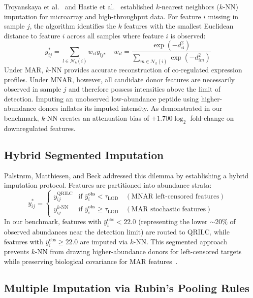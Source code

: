 \documentclass[11pt,oneside]{book}
\begin{document}
Troyanskaya et al.~\cite{troyanskaya2001missing} and Hastie et al.~\cite{hastie2001impute} established $k$-nearest neighbors ($k$-NN) imputation for microarray and high-throughput data. For feature $i$ missing in sample $j$, the algorithm identifies the $k$ features with the smallest Euclidean distance to feature $i$ across all samples where feature $i$ is observed:
\begin{equation}
y_{ij}^* = \sum_{l \in \mathcal{N}_k(i)} w_{il} y_{lj}, \quad w_{il} = \frac{\exp(-d_{il}^2)}{\sum_{m \in \mathcal{N}_k(i)} \exp(-d_{im}^2)}
\end{equation}
Under MAR, $k$-NN provides accurate reconstruction of co-regulated expression profiles. Under MNAR, however, all candidate donor features are necessarily observed in sample $j$ and therefore possess intensities above the limit of detection. Imputing an unobserved low-abundance peptide using higher-abundance donors inflates its imputed intensity. As demonstrated in our benchmark, $k$-NN creates an attenuation bias of $+1.700 \log_2$ fold-change on downregulated features.

\subsection{Hybrid Segmented Imputation}

Palstr\o m, Matthiesen, and Beck \cite{palstrom2020imputation} addressed this dilemma by establishing a hybrid imputation protocol. Features are partitioned into abundance strata:
\begin{equation}
y_{ij}^* = \begin{cases}
y_{ij}^{\text{QRILC}} & \text{if } \bar{y}_i^{\text{obs}} < \tau_{\text{LOD}} \quad (\text{MNAR left-censored features}) \\
y_{ij}^{k\text{-NN}} & \text{if } \bar{y}_i^{\text{obs}} \ge \tau_{\text{LOD}} \quad (\text{MAR stochastic features})
\end{cases}
\end{equation}
In our benchmark, features with $\bar{y}_i^{\text{obs}} < 22.0$ (representing the lower $\sim 20\%$ of observed abundances near the detection limit) are routed to QRILC, while features with $\bar{y}_i^{\text{obs}} \ge 22.0$ are imputed via $k$-NN. This segmented approach prevents $k$-NN from drawing higher-abundance donors for left-censored targets while preserving biological covariance for MAR features~\cite{palstrom2020imputation}.

\subsection{Multiple Imputation via Rubin's Pooling Rules}
\end{document}
